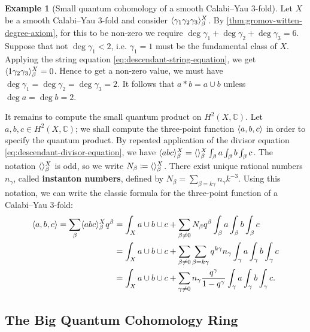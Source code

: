 \documentclass{report}
\theoremstyle{plain}
\theoremstyle{definition}
\newtheorem{example}[theorem]{Example}
\theoremstyle{remark}
\newcommand{\bC}{\mathbb{C}}
\DeclarePairedDelimiter{\inner}{\langle}{\rangle}
\begin{document}
\begin{example}[Small quantum cohomology of a smooth Calabi--Yau $3$-fold]
  Let $X$ be a smooth Calabi--Yau $3$-fold and consider
  $\inner{\gamma_1\gamma_2\gamma_3}_\beta^X$. By
  \ref{thm:gromov-witten-degree-axiom}, for this to be non-zero we
  require $\deg \gamma_1 + \deg \gamma_2 + \deg \gamma_3 = 6$. Suppose
  that not $\deg \gamma_1 < 2$, i.e. $\gamma_1 = 1$ must be the
  fundamental class of $X$. Applying the string equation
  \eqref{eq:descendant-string-equation}, we get
  $\inner{1\gamma_2\gamma_3}_\beta^X = 0$. Hence to get a non-zero
  value, we must have $\deg \gamma_1 = \deg \gamma_2 = \deg \gamma_3 =
  2$. It follows that $a * b = a \cup b$ unless $\deg a = \deg b = 2$.

  It remains to compute the small quantum product on $H^2(X, \bC)$.
  Let $a, b, c \in H^2(X, \bC)$; we shall compute the three-point
  function $\inner{a,b,c}$ in order to specify the quantum product. By
  repeated application of the divisor equation
  \eqref{eq:descendant-divisor-equation}, we have $\inner{abc}_\beta^X
  = \inner{}_\beta^X \int_\beta a \int_\beta b \int_\beta c$. The
  notation $\inner{}_\beta^X$ is odd, so we write $N_\beta \coloneqq
  \inner{}_\beta^X$. There exist unique rational numbers $n_\gamma$,
  called {\bf instanton numbers}, defined by $N_\beta = \sum_{\beta =
    k\gamma} n_\gamma k^{-3}$. Using this notation, we can write the
  classic formula for the three-point function of a Calabi--Yau
  $3$-fold:
  \begin{equation} \label{eq:calabi-yau-threefold-three-point-function}
  \begin{aligned}
    \inner{a,b,c} = \sum_\beta \inner{abc}_\beta^X q^\beta
    &= \int_X a \cup b \cup c + \sum_{\beta \neq 0} N_\beta q^\beta \int_\beta a \int_\beta b \int_\beta c \\
    &= \int_X a \cup b \cup c + \sum_{\beta \neq 0} \sum_{\beta = k\gamma} q^{k\gamma} n_\gamma \int_\gamma a \int_\gamma b \int_\gamma c \\
    &= \int_X a \cup b \cup c + \sum_{\gamma \neq 0} n_\gamma \frac{q^\gamma}{1 - q^\gamma} \int_\gamma a \int_\gamma b \int_\gamma c.
  \end{aligned}
  \end{equation}
\end{example}

\subsection{The Big Quantum Cohomology Ring}
\end{document}
